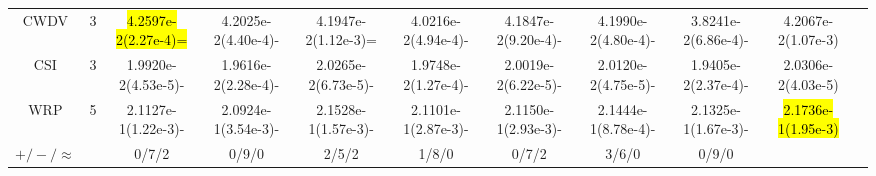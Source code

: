 \documentclass[a4paper,fleqn]{cas-dc}
\newcommand{\highlight}[1]{
	\begingroup
	\sethlcolor{Seashell}%
	\hl{#1}%
	\endgroup
}
\begin{document}
\begin{sloppypar}
\begin{table}[ht]
{\begin{tabular}{ccccccccccc}
			{{CWDV}} &3 &\highlight{4.2597e-2(2.27e-4)=}		&4.2025e-2(4.40e-4)-	&4.1947e-2(1.12e-3)=	&4.0216e-2(4.94e-4)-	&4.1847e-2(9.20e-4)-	&4.1990e-2(4.80e-4)- &3.8241e-2(6.86e-4)- &4.2067e-2(1.07e-3)\\
			{{CSI}}&3  &1.9920e-2(4.53e-5)-  		&1.9616e-2(2.28e-4)- &2.0265e-2(6.73e-5)- 		&1.9748e-2(1.27e-4)-	&2.0019e-2(6.22e-5)-	&2.0120e-2(4.75e-5)- &1.9405e-2(2.37e-4)- &2.0306e-2(4.03e-5)\\
			{{WRP}}&5 &2.1127e-1(1.22e-3)-	&2.0924e-1(3.54e-3)-	&2.1528e-1(1.57e-3)-	&2.1101e-1(2.87e-3)-	&2.1150e-1(2.93e-3)-	&2.1444e-1(8.78e-4)- &2.1325e-1(1.67e-3)-  &\highlight{2.1736e-1(1.95e-3)}\\
			\midrule[0.35pt]
			
			
			$+/-/\approx$&~&0/7/2      &0/9/0    &2/5/2   &1/8/0  &0/7/2 &3/6/0 &0/9/0   \\
			\hline
		\end{tabular}
	}
\end{table}

\begin{table}[ht]
	\centering
	\caption{ {HV values obtained by TS-MOEA-EPF and {6 of 13}  MaOEAs {on the practical problems}, where ``+'', ``-'', and ``='' respectively represent the comparison algorithms being superior, inferior, and equivalent to TS-MOEA-EPF (Part II)}}\label{table:the average HV of MaOPs on Pratical Problems2}
\end{table}
\end{sloppypar}
\end{document}
